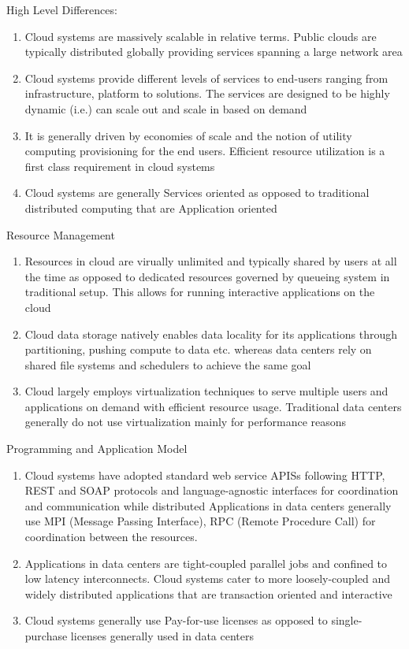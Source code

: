 \documentclass[11pt,a4paper,oneside]{article}
\begin{document}
\begin{enumerate}
                High Level Differences:
                \begin{enumerate}
                	\item Cloud systems are massively scalable in relative terms. Public clouds are typically distributed globally providing services spanning a large network area
                	\item Cloud systems provide different levels of services to end-users ranging from infrastructure, platform to solutions. The services are designed to be highly dynamic (i.e.) can scale out and scale in based on demand
                	\item It is generally driven by economies of scale and the notion of utility computing provisioning for the end users. Efficient resource utilization is a first class requirement in cloud systems 
                	\item Cloud systems are generally Services oriented as opposed to traditional distributed computing that are Application oriented
                \end{enumerate}
                Resource Management
                \begin{enumerate}
                	\item Resources in cloud are virually unlimited and typically shared by users at all the time as opposed to dedicated resources governed by queueing system in traditional setup. This allows for running interactive applications on the cloud
                	\item Cloud data storage natively enables data locality for its applications through partitioning, pushing compute to data etc. whereas data centers rely on shared file systems and schedulers to achieve the same goal
                	\item Cloud largely employs virtualization techniques to serve multiple users and applications on demand with efficient resource usage. Traditional data centers generally do not use virtualization mainly for performance reasons
                \end{enumerate}
                Programming and Application Model
                \begin{enumerate}
                	\item Cloud systems have adopted standard web service APISs following HTTP, REST and SOAP protocols and language-agnostic interfaces for coordination and communication while distributed Applications in data centers generally use MPI (Message Passing Interface), RPC (Remote Procedure Call) for coordination between the resources.   
                	\item Applications in data centers are tight-coupled parallel jobs and confined to low latency interconnects. Cloud systems cater to more loosely-coupled and widely distributed applications that are transaction oriented and interactive
                	\item Cloud systems generally use Pay-for-use licenses as opposed to single-purchase licenses generally used in data centers
                \end{enumerate}   	
         

\end{enumerate}
\end{document}
